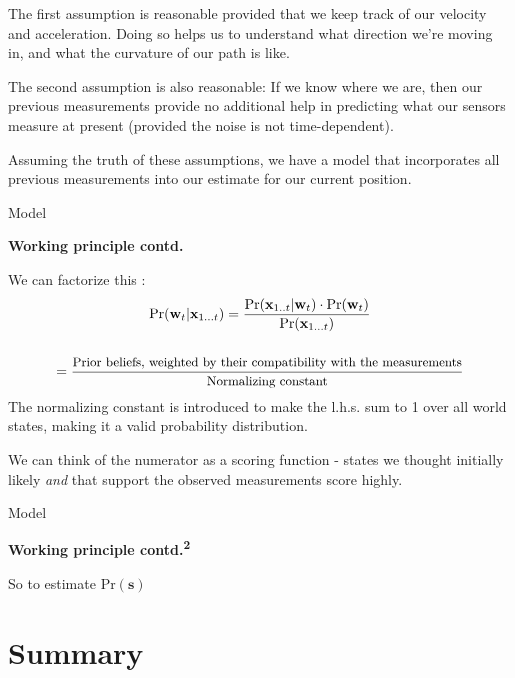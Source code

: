 \documentclass[10pt]{beamer}
\begin{document}
\begin{frame}
	The first assumption is reasonable provided that we keep track of our velocity and acceleration. Doing so helps us to understand what direction we're moving in, and what the curvature of our path is like.

	The second assumption is also reasonable: If we know where we are, then our previous measurements provide no additional help in predicting what our sensors measure at present (provided the noise is not time-dependent).
\end{frame}

\begin{frame}
	Assuming the truth of these assumptions, we have a model that incorporates all previous measurements into our estimate for our current position.
\end{frame}


\begin{frame}{Model}
	
	\textbf{Working principle contd.}
	
	We can factorize this :
	\begin{gather*}
		\text{Pr}(\mathbf{w}_t|\mathbf{x}_{1...t}) = \frac{\text{Pr}(\mathbf{x}_{1..t}|\mathbf{w}_t)\cdot \text{Pr}(\mathbf{w}_t)}{\text{Pr}(\mathbf{x}_{1...t})} \\[1.5em]
		= \frac{\text{\small{Prior beliefs, weighted by their compatibility with the measurements}}}{\text{\small{Normalizing constant}}}
	\end{gather*}
	The normalizing constant is introduced to make the l.h.s. sum to 1 over all world states, making it a valid probability distribution. 
	
	We can think of the numerator as a scoring function - states we thought initially likely \emph{and} that support the observed measurements score highly.

\end{frame}

\begin{frame}{Model}
	
	\textbf{Working principle contd.\textsuperscript{2}}
	
	So to estimate $\text{Pr}(\mathbf{s})$

\end{frame}


\section{Summary}
\end{document}
